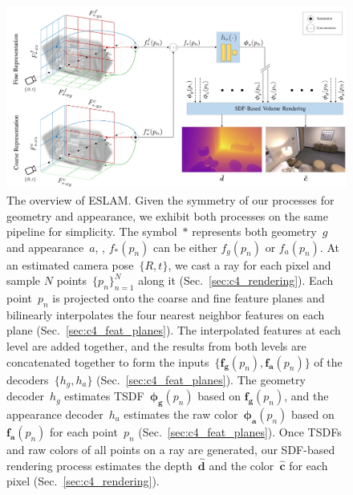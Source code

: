 \begin{figure}[t]
    \begin{center}
        \includegraphics[width=1.0\linewidth]{images/chapter4/figures/Fig2.jpg}
    \end{center}
    \caption{The overview of ESLAM. Given the symmetry of our processes for geometry and appearance, we exhibit both processes on the same pipeline for simplicity. The symbol~$*$ represents both geometry~$g$ and appearance~$a$, \eg, $f_{*}(p_{n})$ can be either $f_{g}(p_{n})$ or $f_{a}(p_{n})$. At an estimated camera pose~$\{R,t\}$, we cast a ray for each pixel and sample $N$ points~$\{p_{n}\}_{n=1}^{N}$ along it (Sec.~\ref{sec:c4_rendering}). Each point~$p_{n}$ is projected onto the coarse and fine feature planes and bilinearly interpolates the four nearest neighbor features on each plane (Sec.~\ref{sec:c4_feat_planes}). The interpolated features at each level are added together, and the results from both levels are concatenated together to form the inputs~$\{\boldsymbol{f_{g}}(p_{n}), \boldsymbol{f_{a}}(p_{n})\}$ of the decoders~$\{h_{g}, h_{a}\}$ (Sec.~\ref{sec:c4_feat_planes}). The geometry decoder~$h_{g}$ estimates TSDF~$\boldsymbol{\phi_{g}}(p_{n})$ based on $\boldsymbol{f_{g}}(p_{n})$, and the appearance decoder~$h_{a}$ estimates the raw color~$\boldsymbol{\phi_{a}}(p_{n})$ based on $\boldsymbol{f_{a}}(p_{n})$ for each point~$p_{n}$ (Sec.~\ref{sec:c4_feat_planes}). Once TSDFs and raw colors of all points on a ray are generated, our SDF-based rendering process estimates the depth~$\boldsymbol{\hat{d}}$ and the color~$\boldsymbol{\hat{c}}$ for each pixel (Sec.~\ref{sec:c4_rendering}). 
   }
    \label{fig:c4_arch}
\end{figure}

